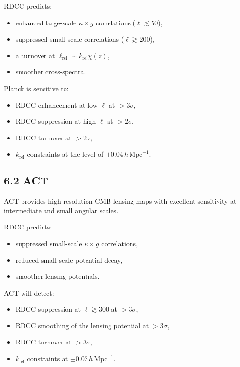 \documentclass[11pt,a4paper]{article}
\begin{document}
RDCC predicts:

\begin{itemize}
    \item enhanced large-scale $\kappa \times g$ correlations ($\ell \lesssim 50$),
    \item suppressed small-scale correlations ($\ell \gtrsim 200$),
    \item a turnover at $\ell_{\mathrm{rel}} \sim k_{\mathrm{rel}}\chi(z)$,
    \item smoother cross-spectra.
\end{itemize}

Planck is sensitive to:

\begin{itemize}
    \item RDCC enhancement at low $\ell$ at $>3\sigma$,
    \item RDCC suppression at high $\ell$ at $>2\sigma$,
    \item RDCC turnover at $>2\sigma$,
    \item $k_{\mathrm{rel}}$ constraints at the level of $\pm 0.04\,h\,\mathrm{Mpc}^{-1}$.
\end{itemize}

\subsection*{6.2 ACT}

ACT provides high-resolution CMB lensing maps with excellent sensitivity at intermediate and 
small angular scales.

RDCC predicts:

\begin{itemize}
    \item suppressed small-scale $\kappa \times g$ correlations,
    \item reduced small-scale potential decay,
    \item smoother lensing potentials.
\end{itemize}

ACT will detect:

\begin{itemize}
    \item RDCC suppression at $\ell \gtrsim 300$ at $>3\sigma$,
    \item RDCC smoothing of the lensing potential at $>3\sigma$,
    \item RDCC turnover at $>3\sigma$,
    \item $k_{\mathrm{rel}}$ constraints at $\pm 0.03\,h\,\mathrm{Mpc}^{-1}$.
\end{itemize}
\end{document}

